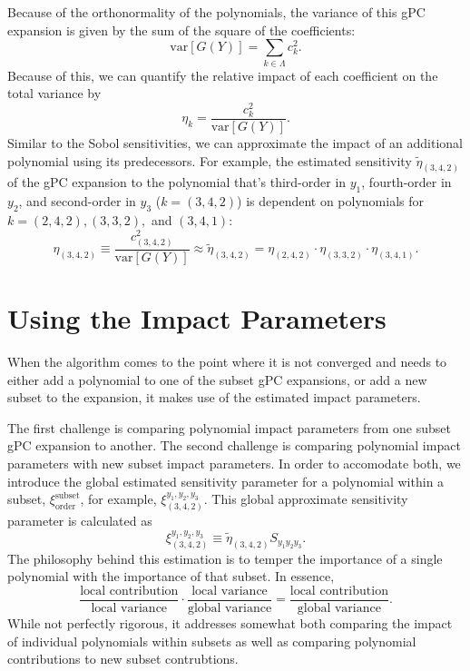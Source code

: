 \documentclass[11pt]{article}
\begin{document}
Because of the orthonormality of the polynomials, the variance of this gPC expansion is given by the sum of the square of the coefficients:
\begin{equation}
\text{var}[G(Y)] = \sum_{k\in\Lambda} c_k^2.
\end{equation}
Because of this, we can quantify the relative impact of each coefficient on the total variance by
\begin{equation}
\eta_k = \frac{c_k^2}{\text{var}[G(Y)]}.
\end{equation}
Similar to the Sobol sensitivities, we can approximate the impact of an additional polynomial using its predecessors.  For example, the estimated sensitivity $\tilde\eta_{(3,4,2)}$ of the gPC expansion to the polynomial that's third-order in $y_1$, fourth-order in $y_2$, and second-order in $y_3$ ($k=(3,4,2)$) is dependent on polynomials for $k=(2,4,2), (3,3,2),$ and $(3,4,1)$:
\begin{equation}
\eta_{(3,4,2)}\equiv\frac{c^2_{(3,4,2)}}{\text{var}[G(Y)]}\approx\tilde \eta_{(3,4,2)} = \eta_{(2,4,2)}\cdot\eta_{(3,3,2)}\cdot\eta_{(3,4,1)}.
\end{equation}

\section{Using the Impact Parameters}
When the algorithm comes to the point where it is not converged and needs to either add a polynomial to one of the subset gPC expansions, or add a new subset to the expansion, it makes use of the estimated impact parameters.

The first challenge is comparing polynomial impact parameters from one subset gPC expansion to another.  The second challenge is comparing polynomial impact parameters with new subset impact parameters.  In order to accomodate both, we introduce the global estimated sensitivity parameter for a polynomial within a subset, $\xi^{\text{subset}}_{\text{order}}$, for example, $\xi^{y_1,y_2,y_3}_{(3,4,2)}$.  This global approximate sensitivity parameter is calculated as
\begin{equation}
\xi_{(3,4,2)}^{y_1,y_2,y_3} \equiv \tilde\eta_{(3,4,2)} S_{y_1y_2y_3}.
\end{equation}
The philosophy behind this estimation is to temper the importance of a single polynomial with the importance of that subset.  In essence,
\begin{equation}
\frac{\text{local contribution}}{\text{local variance}}\cdot\frac{\text{local variance}}{\text{global variance}} = \frac{\text{local contribution}}{\text{global variance}}.
\end{equation}
While not perfectly rigorous, it addresses somewhat both comparing the impact of individual polynomials within subsets as well as comparing polynomial contributions to new subset contrubtions.
\end{document}
